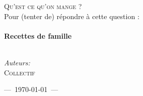 
\begin{titlepage}

\begin{center}


  

\textsc{\LARGE Qu'est ce qu'on mange ?}\\[1.0cm]


\large Pour {\small(tenter de)} répondre à cette question :\\[0.5cm]


\HRule \\[0.8cm]
{ \Huge \bfseries Recettes de famille}\\[0.4cm]

\HRule \\[1.5cm]

\begin{minipage}{0.4\textwidth}
\begin{center}

\large
\emph{Auteurs:}\\
\textsc{Collectif}
\end{center}
\end{minipage}


\vfill

{\large ---~\today~---}

\end{center}

\end{titlepage}